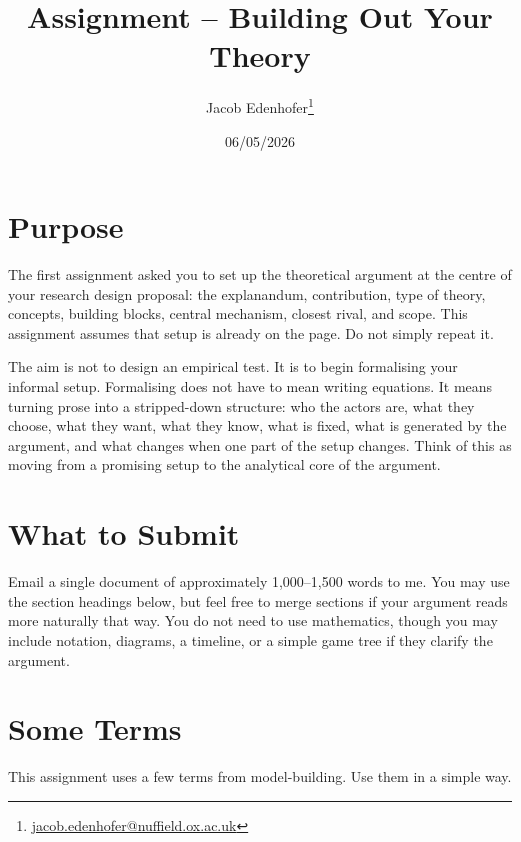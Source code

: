 \documentclass[12pt]{article}
\title{Assignment -- Building Out Your Theory}
\author{Jacob Edenhofer\footnote{\href{mailto:jacob.edenhofer@nuffield.ox.ac.uk}{jacob.edenhofer@nuffield.ox.ac.uk}}}
\date{06/05/2026}
\begin{document}
\maketitle

\section*{Purpose}

The first assignment asked you to set up the theoretical argument at the centre of your research design proposal: the explanandum, contribution, type of theory, concepts, building blocks, central mechanism, closest rival, and scope. This assignment assumes that setup is already on the page. Do not simply repeat it.

The aim is not to design an empirical test. It is to begin formalising your informal setup. Formalising does not have to mean writing equations. It means turning prose into a stripped-down structure: who the actors are, what they choose, what they want, what they know, what is fixed, what is generated by the argument, and what changes when one part of the setup changes. Think of this as moving from a promising setup to the analytical core of the argument.

\section*{What to Submit}

Email a single document of approximately 1,000--1,500 words to me. You may use the section headings below, but feel free to merge sections if your argument reads more naturally that way. You do not need to use mathematics, though you may include notation, diagrams, a timeline, or a simple game tree if they clarify the argument.

\section*{Some Terms}

This assignment uses a few terms from model-building. Use them in a simple way.
\end{document}
